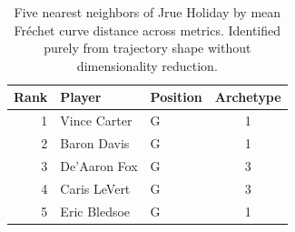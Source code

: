 \begin{table}[htbp]
  \centering\small
  \begin{tabular}{rllc}
    \toprule
    Rank & Player & Position & Archetype \\
    \midrule
    1 & Vince Carter & G & 1 \\
    2 & Baron Davis & G & 1 \\
    3 & De'Aaron Fox & G & 3 \\
    4 & Caris LeVert & G & 3 \\
    5 & Eric Bledsoe & G & 1 \\
    \bottomrule
  \end{tabular}
  \caption{Five nearest neighbors of Jrue Holiday by mean Fr\'{e}chet curve distance across metrics. Identified purely from trajectory shape without dimensionality reduction.}
  \label{tab:Jrue_Holiday_frechet_curve_neighbors}
\end{table}

